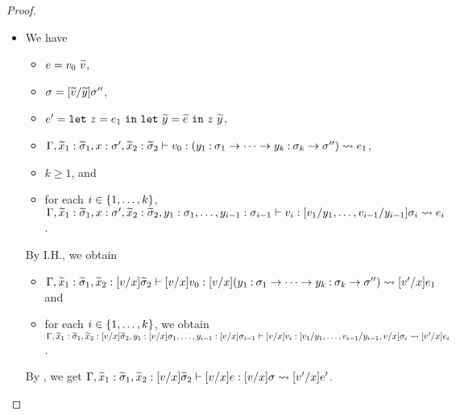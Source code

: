 \begin{proof}
\begin{itemize}
%
\item[] 
We have
\begin{itemize}
\item \(e=v_0\ \widetilde{v}\),
\item \(\sigma=[\widetilde{v}/\widetilde{y}]\sigma''\),
\item \(e'=\LETEQIN{z}{e_1}{\LETEQIN{\seq{y}}{\seq{e}}{z\ \seq{y}}}\),
\item \(\Gamma,\widetilde{x}_1:\widetilde{\sigma}_1,x:\sigma',\widetilde{x}_2:\widetilde{\sigma}_2 \vdash v_0 : (y_1\mathbin{:}\sigma_1 \to \cdots \to y_k\mathbin{:}\sigma_k \to\sigma'') \leadsto e_1\),
\item \(k \geq 1\), and
\item for each $i\in\{1,\ldots,k\}$, \(\Gamma,\widetilde{x}_1:\widetilde{\sigma}_1,x:\sigma',\widetilde{x}_2:\widetilde{\sigma}_2,y_1:\sigma_1,\dots,y_{i-1}:\sigma_{i-1} \vdash v_i : [v_1/y_1,\ldots,v_{i-1}/y_{i-1}]\sigma_i \leadsto e_i\).
\end{itemize}
By I.H., we obtain
\begin{itemize}
\item \(\Gamma,\widetilde{x}_1:\widetilde{\sigma}_1,\widetilde{x}_2:[v/x]\widetilde{\sigma}_2 \vdash [v/x]v_0 : [v/x](y_1\mathbin{:}\sigma_1 \to \cdots \to y_k\mathbin{:}\sigma_k \to\sigma'') \leadsto [v'/x]e_1\) and
\item for each $i\in\{1,\ldots,k\}$, we obtain \(\Gamma,\widetilde{x}_1:\widetilde{\sigma}_1,\widetilde{x}_2:[v/x]\widetilde{\sigma}_2,y_1:[v/x]\sigma_1,\dots,y_{i-1}:[v/x]\sigma_{i-1} \vdash [v/x]v_i : [v_1/y_1,\ldots,v_{i-1}/y_{i-1},v/x]\sigma_i \leadsto [v'/x]e_i\).
\end{itemize}
By , we get
\(\Gamma,\widetilde{x}_1:\widetilde{\sigma}_1,\widetilde{x}_2:[v/x]\widetilde{\sigma}_2 \vdash [v/x]e : [v/x]\sigma \leadsto [v'/x]e'\).


\end{itemize}
\end{proof}
